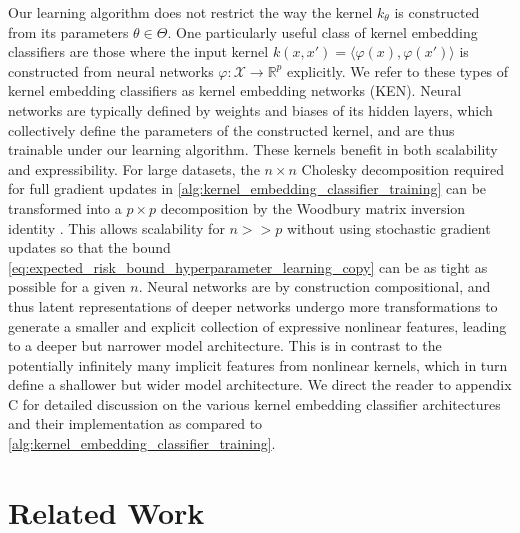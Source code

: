 \documentclass{article}
\begin{document}
	Our learning algorithm does not restrict the way the kernel $k_{\theta}$ is constructed from its parameters $\theta \in \Theta$. One particularly useful class of kernel embedding classifiers are those where the input kernel $k(x, x') = \langle \varphi(x), \varphi(x') \rangle$ is constructed from neural networks $\varphi : \mathcal{X} \to \mathbb{R}^{p}$ explicitly. We refer to these types of kernel embedding classifiers as kernel embedding networks (KEN). Neural networks are typically defined by weights and biases of its hidden layers, which collectively define the parameters of the constructed kernel, and are thus trainable under our learning algorithm. These kernels benefit in both scalability and expressibility. For large datasets, the $n \times n$ Cholesky decomposition required for full gradient updates in \cref{alg:kernel_embedding_classifier_training} can be transformed into a $p \times p$ decomposition by the Woodbury matrix inversion identity \citep{higham2002accuracy}. This allows scalability for $n >> p$ without using stochastic gradient updates so that the bound \eqref{eq:expected_risk_bound_hyperparameter_learning_copy} can be as tight as possible for a given $n$. Neural networks are by construction compositional, and thus latent representations of deeper networks undergo more transformations to generate a smaller and explicit collection of expressive nonlinear features, leading to a deeper but narrower model architecture. This is in contrast to the potentially infinitely many implicit features from nonlinear kernels, which in turn define a shallower but wider model architecture. We direct the reader to appendix C for detailed discussion on the various kernel embedding classifier architectures and their implementation as compared to \cref{alg:kernel_embedding_classifier_training}. 

\section{Related Work}
\label{sec:related_work}
\end{document}
